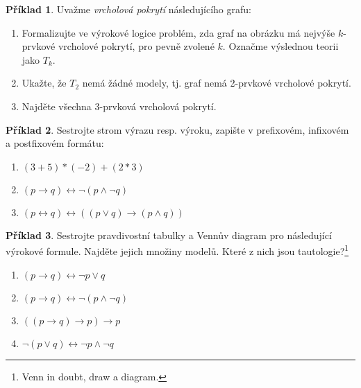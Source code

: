 \documentclass[a4paper]{article}
\theoremstyle{definition}
\newtheorem{problem}{Příklad}
\begin{document}
\medskip\begin{problem}
Uvažme \emph{vrcholová pokrytí} následujícího grafu:
\begin{center}
\end{center}
\begin{enumerate}
    \item Formalizujte ve výrokové logice problém, zda graf na obrázku má nejvýše $k$-prvkové vrcholové pokrytí, pro pevně zvolené $k$. Označme výslednou teorii jako $T_k$.
    \item Ukažte, že $T_2$ nemá žádné modely, tj. graf nemá 2-prvkové vrcholové pokrytí.
    \item Najděte všechna 3-prvková vrcholová pokrytí.
\end{enumerate}
\end{problem}


\medskip\begin{problem}
    Sestrojte strom výrazu resp. výroku, zapište v prefixovém, infixovém a postfixovém formátu:
    \begin{enumerate}
        \item $(3+5)*(-2)+(2*3)$
        \item $(p \to q) \leftrightarrow \neg (p \wedge \neg q)$
        \item $(p \leftrightarrow q) \leftrightarrow ((p \vee q) \to (p \wedge q))$
    \end{enumerate}
\end{problem}


\medskip\begin{problem}
Sestrojte pravdivostní tabulky a Vennův diagram pro následující výrokové formule. Najděte jejich množiny modelů. Které z nich jsou tautologie?\footnote{Venn in doubt, draw a diagram.}
\begin{enumerate}
\item $(p \to q) \leftrightarrow \neg p \vee q$
\item $(p \to q) \leftrightarrow \neg (p \wedge \neg q)$
\item $((p\to q)\to p)\to p$
\item $\neg (p\vee q)\leftrightarrow \neg p\wedge \neg q$
\end{enumerate}
\end{problem}
\end{document}
